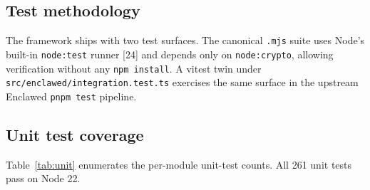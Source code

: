 \documentclass[11pt]{article}
\begin{document}
\subsection{Test methodology}

The framework ships with two test surfaces. The canonical \texttt{.mjs}
suite uses Node's built-in \texttt{node:test} runner [24] and depends
only on \texttt{node:crypto}, allowing verification without any
\texttt{npm install}. A vitest twin under
\texttt{src/enclawed/integration.test.ts} exercises the same surface in
the upstream Enclawed \texttt{pnpm test} pipeline.

\subsection{Unit test coverage}

Table~\ref{tab:unit} enumerates the per-module unit-test counts. All
261 unit tests pass on Node 22.
\end{document}
